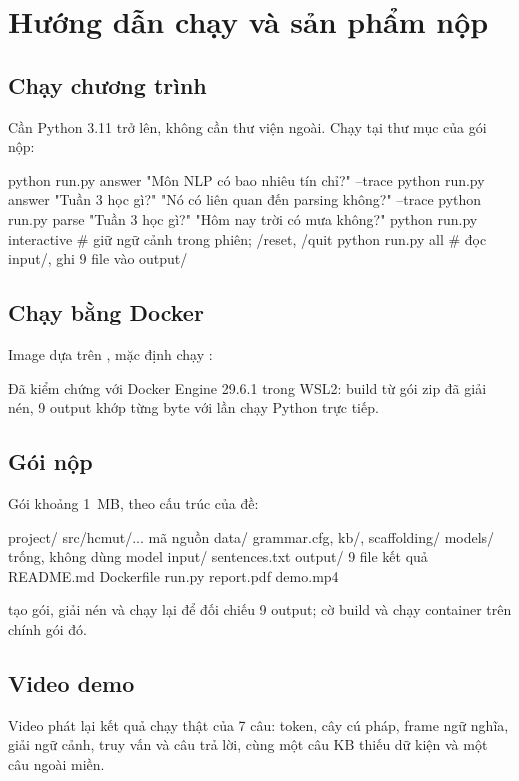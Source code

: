 \section{Hướng dẫn chạy và sản phẩm nộp}
\label{sec:reproduce}

\subsection{Chạy chương trình}

Cần Python 3.11 trở lên, không cần thư viện ngoài. Chạy tại thư mục  của gói
nộp:
\begin{trace}
python run.py answer "Môn NLP có bao nhiêu tín chỉ?" --trace
python run.py answer "Tuần 3 học gì?" "Nó có liên quan đến parsing không?" --trace
python run.py parse "Tuần 3 học gì?" "Hôm nay trời có mưa không?"
python run.py interactive        # giữ ngữ cảnh trong phiên; /reset, /quit
python run.py all                # đọc input/, ghi 9 file vào output/
\end{trace}

\subsection{Chạy bằng Docker}

Image dựa trên , mặc định chạy :
Đã kiểm chứng với Docker Engine 29.6.1 trong WSL2: build từ gói zip đã giải nén, 9 output
khớp từng byte với lần chạy Python trực tiếp.

\subsection{Gói nộp}

Gói  khoảng 1~MB, theo cấu trúc của đề:
\begin{trace}
project/
  src/hcmut/...      mã nguồn
  data/              grammar.cfg, kb/, scaffolding/
  models/            trống, không dùng model
  input/             sentences.txt
  output/            9 file kết quả
  README.md  Dockerfile  run.py
  report.pdf  demo.mp4
\end{trace}
 tạo gói, giải nén và chạy lại để đối chiếu 9 output; cờ
 build và chạy container trên chính gói đó.

\subsection{Video demo}

Video  phát lại kết quả chạy thật của 7 câu: token, cây cú pháp, frame ngữ
nghĩa, giải ngữ cảnh, truy vấn và câu trả lời, cùng một câu KB thiếu dữ kiện và một câu
ngoài miền.
